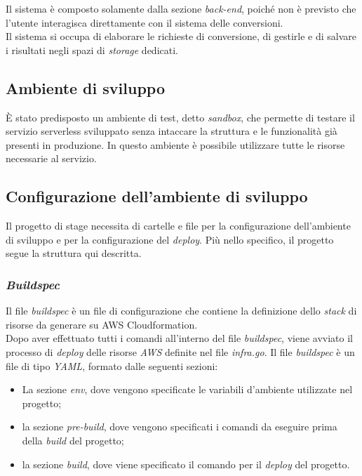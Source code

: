 Il sistema è composto solamente dalla sezione \emph{back-end}, poiché
non è previsto che l'utente interagisca direttamente con il sistema delle
conversioni. \\
Il sistema si occupa di elaborare le richieste di conversione, di gestirle e di
salvare i risultati negli spazi di \emph{storage} dedicati.

\subsection{Ambiente di sviluppo}

È stato predisposto un ambiente di test, detto \emph{sandbox}, che permette di
testare il servizio serverless sviluppato senza intaccare la struttura e le
funzionalità già presenti in produzione. In questo ambiente è possibile
utilizzare tutte le risorse necessarie al servizio.

\subsection{Configurazione dell'ambiente di sviluppo}

Il progetto di stage necessita di cartelle e file per la configurazione
dell'ambiente di sviluppo e per la configurazione del \emph{deploy}. Più nello
specifico, il progetto segue la struttura qui descritta.

\subsubsection*{\emph{Buildspec}}

Il file \emph{buildspec} è un file di configurazione che contiene la definizione
dello \emph{stack} di risorse da generare su \glsfirstoccur\gls{AWS
      Cloudformation}. \\
Dopo aver effettuato tutti i comandi all'interno del file \emph{buildspec},
viene avviato il processo di \emph{deploy} delle risorse \emph{AWS} definite nel
file \emph{infra.go}. Il file \emph{buildspec} è un file di tipo \emph{YAML},
formato dalle seguenti sezioni:
\begin{itemize}
      \item La sezione \emph{env}, dove vengono specificate le variabili
            d'ambiente utilizzate nel progetto;
      \item la sezione \emph{pre-build}, dove vengono specificati i comandi da
            eseguire prima della \emph{build} del progetto;
      \item la sezione \emph{build}, dove viene specificato il comando per il
            \emph{deploy} del progetto.
\end{itemize}

